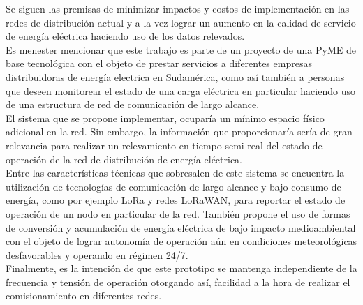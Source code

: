 \documentclass[11pt]{charter}
\begin{document}
Se siguen las premisas de minimizar impactos y costos de implementación en las redes de distribución actual y a la vez lograr un aumento en la calidad de servicio de energía eléctrica haciendo uso de los datos relevados.\\

Es menester mencionar que este trabajo es parte de un proyecto de una PyME de base tecnológica con el objeto de prestar servicios a diferentes empresas distribuidoras de energía electrica en Sudamérica, como así también a personas que deseen monitorear el estado de una carga eléctrica en particular haciendo uso de una estructura de red de comunicación de largo alcance.\\

El sistema que se propone implementar, ocuparía un mínimo espacio físico adicional en la red. Sin embargo, la información que proporcionaría sería de gran relevancia para realizar un relevamiento en tiempo semi real del estado de operación de la red de distribución de energía eléctrica.\\

Entre las características técnicas que sobresalen de este sistema se encuentra la utilización de tecnologías de comunicación de largo alcance y bajo consumo de energía, como por ejemplo LoRa y redes LoRaWAN, para reportar el estado de operación de un nodo en particular de la red. También propone el uso de formas de conversión y acumulación de energía eléctrica de bajo impacto medioambiental con el objeto de lograr autonomía de operación aún en condiciones meteorológicas desfavorables y operando en régimen 24/7.\\

Finalmente, es la intención de que este prototipo se mantenga independiente de la frecuencia y tensión de operación otorgando así, facilidad a la hora de realizar el comisionamiento en diferentes redes.\\
\end{document}
